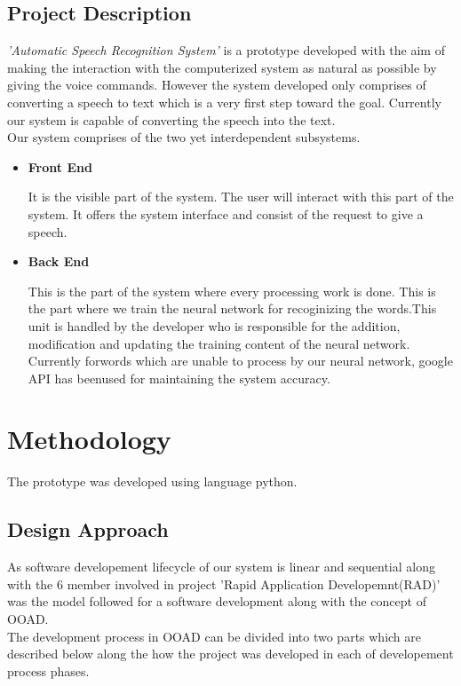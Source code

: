 \documentclass[a4paper,12pt,onepage]{article}
\begin{document}
	\subsection{Project Description}
	\emph{'Automatic Speech Recognition System'} is a prototype developed with the aim of making the interaction with the computerized system as natural as possible by giving the voice commands. However the system developed only comprises of converting a speech to text which is a very first step toward the goal. Currently our system is capable of converting the speech into the text.\\
Our system comprises of the two yet interdependent subsystems.
\begin{itemize}
\item \textbf{Front End} 
\par
It is the visible part of the system. The user will interact with this part of the system. It offers the system interface and consist of the request to give a speech.
\item \textbf{Back End}
\par
This is the part of the system where every processing work is done. This is the part where we train the neural network for recoginizing the words.This unit is handled by the developer who is responsible for the addition, modification and updating the training content of the neural network. Currently forwords which are unable to process by our neural network, google API has beenused for maintaining the system accuracy.
\end{itemize}
	\newpage
\section{Methodology}
The prototype was developed using language python.
\subsection{Design Approach}
As software developement lifecycle of our system is linear and sequential along with the 6 member involved in project 'Rapid Application Developemnt(RAD)' was the model followed for a software development along with the concept of OOAD.\\
The development process in OOAD can be divided into two parts which are described below along the how the project was developed in each of developement process phases.
\end{document}
